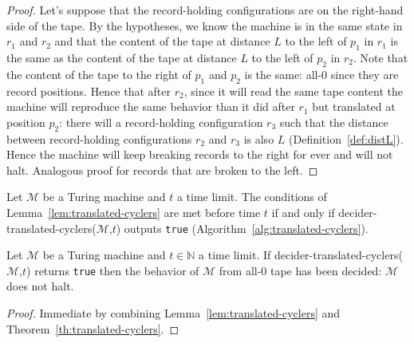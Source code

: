\begin{proof}\normalfont
Let's suppose that the record-holding configurations are on the right-hand side of the tape. By the hypotheses, we know the machine is in the same state in $r_1$ and $r_2$ and that the content of the tape at distance $L$ to the left of $p_1$ in $r_1$ is the same as the content of the tape at distance $L$ to the left of $p_2$ in $r_2$. Note that the content of the tape to the right of $p_1$ and $p_2$ is the same: all-0 since they are record positions. Hence that after $r_2$, since it will read the same tape content the machine will reproduce the same behavior than it did after $r_1$ but translated at position $p_2$: there will a record-holding configuration $r_3$ such that the distance between record-holding configurations $r_2$ and $r_3$ is also $L$ (Definition~\ref{def:distL}). Hence the machine will keep breaking records to the right for ever and will not halt. Analogous proof for records that are broken to the left.
\end{proof}

\begin{theorem}\label{th:translated-cyclers}\normalfont
  Let $\mathcal{M}$ be a Turing machine and $t$ a time limit. The conditions of Lemma~\ref{lem:translated-cyclers} are met before time $t$ if and only if {\sc decider-translated-cyclers}($\mathcal{M}$,$t$) outputs \texttt{true} (Algorithm~\ref{alg:translated-cyclers}).
\end{theorem}

\begin{corollary}\normalfont
  Let $\mathcal{M}$ be a Turing machine and $t \in \mathbb{N}$ a time limit. If {\sc decider-translated-cyclers}($\mathcal{M}$,$t$) returns \texttt{true} then the behavior of $\mathcal{M}$ from all-0 tape has been decided: $\mathcal{M}$ does not halt.
\end{corollary}
\begin{proof}
Immediate by combining Lemma~\ref{lem:translated-cyclers} and Theorem~\ref{th:translated-cyclers}.
\end{proof}